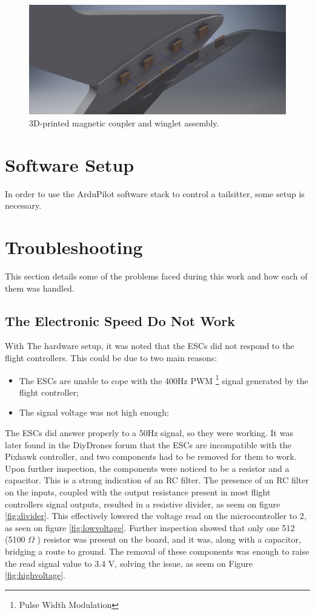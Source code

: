 \begin{figure}[H]
\centering
  \includegraphics[width=\linewidth]{figs/magnetassembly.png}
  \caption{3D-printed magnetic coupler and winglet assembly.}
  \label{fig:magnetcoupler}
\end{figure}
	

\section{Software Setup}

In order to use the ArduPilot software stack to control a tailsitter, some setup is necessary.

\section{Troubleshooting}

This section details some of the problems faced during this work and how each of them was handled.

\subsection{The Electronic Speed Do Not Work}
With The hardware setup, it was noted that the ESCs did not respond to the flight controllers. This could be due to two main reasons:
\begin{itemize}
\item The ESCs are unable to cope with the 400Hz PWM \footnote{Pulse Width Modulation} signal generated by the flight controller;
\item The signal voltage was not high enough;
\end{itemize}

The ESCs did answer properly to a 50Hz signal, so they were working.
%
It was later found in the DiyDrones\cite{diydronesesc} forum that the ESCs are incompatible with the Pixhawk controller, and two components had to be removed for them to work.
%
Upon further inspection, the components were noticed to be a resistor and a capacitor. This is a strong indication of an RC filter. The presence of an RC filter on the inputs, coupled with the output resistance present in most flight controllers signal outputs, resulted in a resistive divider, as seem on figure \ref{fig:divider}.
This effectively lowered the voltage read on the microcontroller to 2, as seen on figure \ref{fig:lowvoltage}.
Further inspection showed that only one 512 (5100 $\Omega$ ) resistor was present on the board, and it was, along with a capacitor, bridging a route to ground.
The removal of these components was enough to raise the read signal value to 3.4 V, solving the issue, as seem on Figure \ref{fig:highvoltage}.

